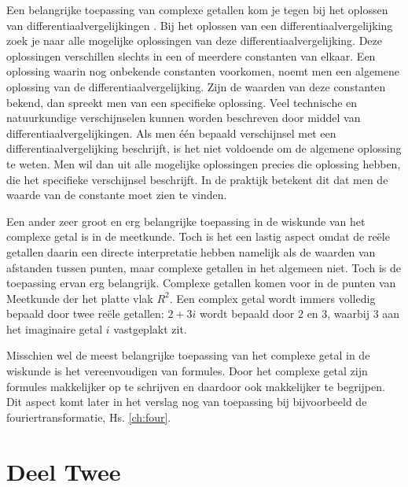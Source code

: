 \documentclass[11pt,fleqn]{book} %
\begin{document}
Een belangrijke toepassing van complexe getallen kom je tegen bij het oplossen van differentiaalvergelijkingen \cite{complexegetallenleiden}. Bij het oplossen van een differentiaalvergelijking zoek je naar alle mogelijke oplossingen van deze differentiaalvergelijking. Deze oplossingen verschillen slechts in een of meerdere constanten van elkaar. Een oplossing waarin nog onbekende constanten voorkomen, noemt men een algemene oplossing van de differentiaalvergelijking. Zijn de waarden van deze constanten bekend, dan spreekt men van een specifieke oplossing. Veel technische en natuurkundige verschijnselen kunnen worden beschreven door middel van differentiaalvergelijkingen. Als men één bepaald verschijnsel met een differentiaalvergelijking beschrijft, is het niet voldoende om de algemene oplossing te weten. Men wil dan uit alle mogelijke oplossingen precies die oplossing hebben, die het specifieke verschijnsel beschrijft. In de praktijk betekent dit dat men de waarde van de constante moet zien te vinden.

Een ander zeer groot en erg belangrijke toepassing in de wiskunde van het complexe getal is in de meetkunde. Toch is het een lastig aspect omdat de reële getallen daarin een directe interpretatie hebben namelijk als de waarden van afstanden tussen punten, maar complexe getallen in het algemeen niet. Toch is de toepassing ervan erg belangrijk. Complexe getallen komen voor in de punten van Meetkunde der het platte vlak $R^2$. Een complex getal wordt immers volledig bepaald door twee reële getallen: $2 + 3i$ wordt bepaald door $2$ en $3$, waarbij $3$ aan het imaginaire getal $i$ vastgeplakt zit.

Misschien wel de meest belangrijke toepassing van het complexe getal in de wiskunde is het vereenvoudigen van formules. Door het complexe getal zijn formules makkelijker op te schrijven en daardoor ook makkelijker te begrijpen. Dit aspect komt later in het verslag nog van toepassing bij bijvoorbeeld de fouriertransformatie, Hs. \ref{ch:four}\cite{nogmeergetallen}\cite{cgetallenincontext}.




\part{Deel Twee}
\end{document}

